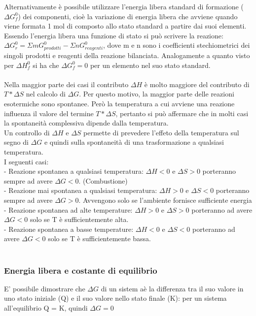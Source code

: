 Alternativamente è possibile utilizzare l'energia libera standard di formazione ($\Delta G_f^0$) dei componenti, cioè la variazione di energia libera che avviene quando viene formata 1 mol di composto allo stato standard a partire dai suoi elementi.\\
Essendo l'energia libera una funzione di stato si può scrivere la reazione: $\Delta G^0_r = \Sigma mG^0_{prodotti} - \Sigma nG_{reagenti}^0$, dove m e n sono i coefficienti stechiometrici dei singoli prodotti e reagenti della reazione bilanciata. Analogamente a quanto visto per $\Delta H_f^0$ si ha che $\Delta G_f^0 = 0$ per un elemento nel suo stato standard.\\\\
Nella maggior parte dei casi il contributo $\Delta H$ è molto maggiore del contributo di $T * \Delta S$ nel calcolo di $\Delta G$. Per questo motivo, la maggior parte delle reazioni esotermiche sono spontanee. Però la temperatura a cui avviene una reazione influenza il valore del termine $T * \Delta S$, pertanto si può affermare che in molti casi la spontaneità complessiva dipende dalla temperatura.\\
Un controllo di $\Delta H$ e $\Delta S$ permette di prevedere l'effeto della temperatura sul segno di $\Delta G$ e quindi sulla spontaneità di una trasformazione a qualsiasi temperatura.\\
I seguenti casi:\\
\tab- Reazione spontanea a qualsiasi temperatura: $\Delta H < 0 $ e $ \Delta S > 0$ porteranno sempre ad avere $\Delta G < 0$. (Combustione)\\
\tab- Reazione mai spontanea a qualsiasi temperatura: $\Delta H > 0$ e $\Delta S < 0$ porteranno sempre ad avere $\Delta G > 0$. Avvengono solo se l'ambiente fornisce sufficiente energia\\
\tab- Reazione spontanea ad alte temperature: $\Delta H > 0$ e $\Delta S > 0$ porteranno ad avere $\Delta G < 0$ solo se T è sufficientemente alta.\\
\tab- Reazione spontanea a basse temperature: $\Delta H < 0$ e $\Delta S < 0$ porteranno ad avere $\Delta G < 0$ solo se T è sufficientemente bassa.\\\\
\subsubsection{Energia libera e costante di equilibrio}
E' possibile dimostrare che $\Delta G$ di un sistem aè la differenza tra il suo valore in uno stato iniziale (Q) e il suo valore nello stato finale (K): per un sistema all'equilibrio Q = K, quindi $\Delta G = 0$